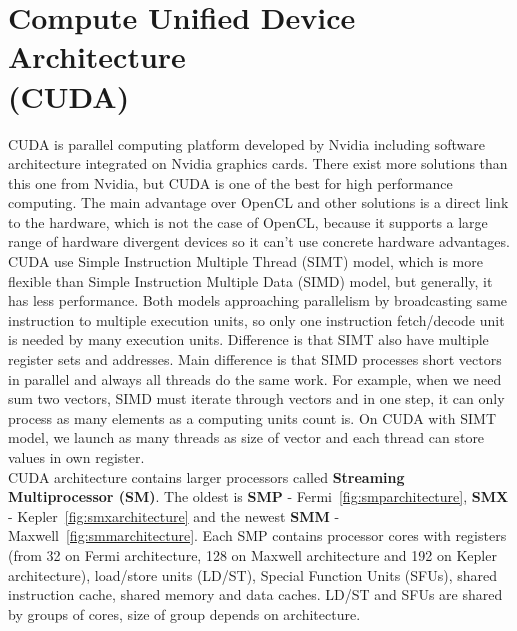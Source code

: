 \section[Compute Unified Device Architecture]{Compute Unified Device Architecture\\ (CUDA)}
CUDA is parallel computing platform developed by Nvidia including software architecture integrated on Nvidia graphics cards. There exist more solutions than this one from Nvidia, but CUDA is one of the best for high performance computing. The main advantage over OpenCL and other solutions is a direct link to the hardware, which is not the case of OpenCL, because it supports a large range of hardware divergent devices so it can't use concrete hardware advantages. \\
CUDA use Simple Instruction Multiple Thread (SIMT) model, which is more flexible than Simple Instruction Multiple Data (SIMD) model, but generally, it has less performance. Both models approaching parallelism by broadcasting same instruction to multiple execution units, so only one instruction fetch/decode unit is needed by many execution units. Difference is that SIMT also have multiple register sets and addresses. Main difference is that SIMD processes short vectors in parallel and always all threads do the same work. For example, when we need sum two vectors, SIMD must iterate through vectors and in one step, it can only process as many elements as a computing units count is. On CUDA with SIMT model, we launch as many threads as size of vector and each thread can store values in own register.\\
CUDA architecture contains larger processors called \textbf{Streaming Multiprocessor (SM)}. The oldest is \textbf{SMP} - Fermi~\autoref{fig:smparchitecture}, \textbf{SMX} - Kepler~\autoref{fig:smxarchitecture} and the newest \textbf{SMM} - Maxwell~\autoref{fig:smmarchitecture}. Each SMP contains processor cores with registers (from 32 on Fermi architecture, 128 on Maxwell architecture and 192 on Kepler architecture), load/store units (LD/ST), Special Function Units (SFUs), shared instruction cache, shared memory and data caches. LD/ST and SFUs are shared by groups of cores, size of group depends on architecture.\\
